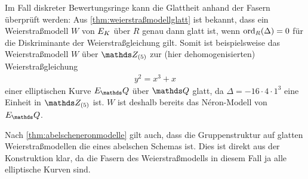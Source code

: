 \begin{Bemerkung}
  Im Fall diskreter Bewertungsringe kann die Glattheit anhand der Fasern
  überprüft werden:
  Aus \ref{thm:weierstraßmodellglatt} ist bekannt,
  dass ein Weierstraßmodell $W$ von $E_{K}$ über $R$ genau dann glatt
  ist, wenn $\operatorname{ord}_R(\Delta)=0$ für die Diskriminante der
  Weierstraßgleichung gilt.
  Somit ist beispielsweise das Weierstraßmodell $W$ über $\Z_{(5)}$
  zur (hier dehomogenisierten) Weierstraßgleichung
  \begin{gather*}
    y^2=x^3+x
  \end{gather*}
  einer elliptischen Kurve $E_\Q$ über $\Q$ glatt, da
  $\Delta=-16\cdot4\cdot1^3$ eine Einheit in $\Z_{(5)}$ ist.
  $W$ ist deshalb bereits das Néron-Modell von $E_\Q$.

  Nach \ref{thm:abelscheneronmodelle} gilt auch, dass die
  Gruppenstruktur auf glatten Weierstraßmodellen die eines abelschen
  Schemas ist.
  Dies ist direkt aus der Konstruktion klar, da die Fasern des
  Weierstraßmodells in diesem Fall ja alle elliptische Kurven sind.
\end{Bemerkung}

